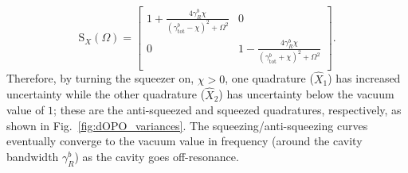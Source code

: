 \begin{equation} \label{eq:dOPO_fixed_phase}
\text{S}_X(\Omega)=\left[
\begin{array}{cc}
 1+\frac{4 \gamma^b_R \chi}{\left({\gamma^b_\text{tot}}-\chi\right)^2+\Omega ^2}
 & 0 \\
 0
 & 1-\frac{4 \gamma^b_R \chi}{\left({\gamma^b_\text{tot}}+\chi\right)^2+\Omega ^2} \\
\end{array}
\right].
\end{equation}
Therefore, by turning the squeezer on, $\chi>0$, one quadrature ($\hat X_1$) has increased uncertainty while the other quadrature ($\hat X_2$) has uncertainty below the vacuum value of $1$; these are the anti-squeezed and squeezed quadratures, respectively, as shown in Fig.~\ref{fig:dOPO_variances}. The squeezing/anti-squeezing curves eventually converge to the vacuum value in frequency (around the cavity bandwidth $\gamma^b_R$) as the cavity goes off-resonance. %


\label{sec:dOPO_threshold}

